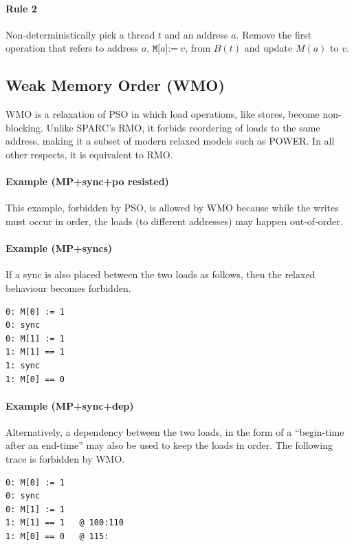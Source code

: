 \documentclass[11pt]{article}
\begin{document}
\paragraph{Rule 2}

Non-deterministically pick a thread $t$ and an address $a$.  Remove
the first operation that refers to address $a$,
$\texttt{M[}a\texttt{]:=}~v$, from $B(t)$ and update $M(a)$ to $v$.

\subsection{Weak Memory Order (WMO)}

WMO is a relaxation of PSO in which load operations, like stores,
become non-blocking.  Unlike SPARC's RMO, it forbids reordering of
loads to the same address, making it a subset of modern relaxed models
such as POWER.  In all other respects, it is equivalent to RMO.

\paragraph{Example (MP+sync+po resisted)} This example, forbidden by
PSO, is allowed by WMO because while the writes must occur in
order, the loads (to different addresses) may happen out-of-order.

\paragraph{Example (MP+syncs)}  If a sync is also placed between the
two loads as follows, then the relaxed behaviour becomes forbidden.

\begin{verbatim}
0: M[0] := 1
0: sync
0: M[1] := 1
1: M[1] == 1
1: sync
1: M[0] == 0
\end{verbatim}

\paragraph{Example (MP+sync+dep)} Alternatively, a dependency between
the two loads, in the form of a ``begin-time after an end-time'' may
also be used to keep the loads in order.  The following trace is
forbidden by WMO.

\begin{verbatim}
0: M[0] := 1
0: sync
0: M[1] := 1
1: M[1] == 1   @ 100:110
1: M[0] == 0   @ 115:
\end{verbatim}
\end{document}

